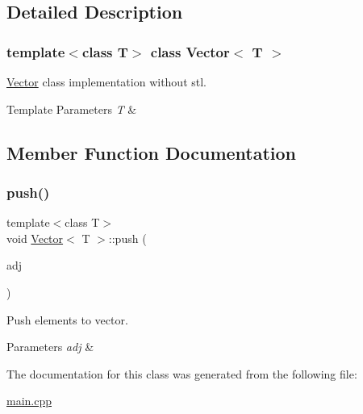 \subsection{Detailed Description}
\subsubsection*{template$<$class T$>$\newline
class Vector$<$ T $>$}

\hyperlink{classVector}{Vector} class implementation without stl. 


\begin{DoxyTemplParams}{Template Parameters}
{\em T} & \\
\hline
\end{DoxyTemplParams}


\subsection{Member Function Documentation}
\mbox{\label{classVector_ae20302aab0ca138a87c1541a7f68214d}} 
\subsubsection{\texorpdfstring{push()}{push()}}
{\footnotesize\ttfamily template$<$class T$>$ \\
void \hyperlink{classVector}{Vector}$<$ T $>$\+::push (\begin{DoxyParamCaption}\item[{T}]{adj }\end{DoxyParamCaption})\hspace{0.3cm}{\ttfamily [inline]}}



Push elements to vector. 


\begin{DoxyParams}{Parameters}
{\em adj} & \\
\hline
\end{DoxyParams}


The documentation for this class was generated from the following file\+:\begin{DoxyCompactItemize}
\item 
\hyperlink{main_8cpp}{main.\+cpp}\end{DoxyCompactItemize}
